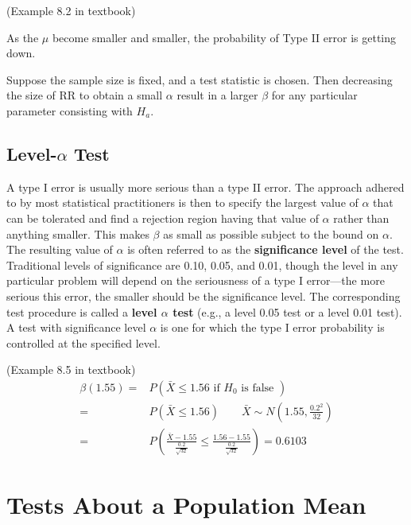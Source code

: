 \begin{exmp}
(Example 8.2 in textbook)

As the $\mu$ become smaller and smaller, the probability of Type II error is getting down.
\end{exmp}


\begin{prop}
Suppose the sample size is fixed, and a test statistic is chosen. Then decreasing the size of RR to obtain a small $\alpha$ result in a larger $\beta$ for any particular parameter consisting with $H_a$.
\end{prop}

\subsection{Level-$\alpha$ Test}
A type I error is usually more serious than a type II error. The approach adhered to by most statistical practitioners is then to specify the largest value of $\alpha$ that can be tolerated and find a rejection region having that value of $\alpha$ rather than anything smaller. This makes $\beta$ as small as possible subject to the bound on $\alpha$. The resulting value of $\alpha$ is often referred to as the \textbf{significance level} of the test. Traditional levels of significance are 0.10, 0.05, and 0.01, though the level in any particular problem will depend on the seriousness of a type I error—the more serious this error, the smaller should be the significance level. The corresponding test procedure is called a \textbf{level $\alpha$ test} (e.g., a level 0.05 test or a level 0.01 test). A test with significance level $\alpha$ is one for which the type I error probability is controlled at the specified level.

\begin{exmp}
(Example 8.5 in textbook)
\begin{align*}
\beta(1.55)= & P(\bar{X}\leq 1.56 \text{ if }H_0 \text{ is false } ) \\
= & P(\bar{X} \leq 1.56) \qquad \bar{X}\sim N\left(1.55,\frac{0.2^2}{32}\right) \\
= & P\left(\frac{\bar{X}-1.55}{\frac{0.2}{\sqrt{32}}} \leq  \frac{1.56-1.55}{\frac{0.2}{\sqrt{32}}} \right)=0.6103
\end{align*}
\end{exmp}



\section{Tests About a Population Mean}

